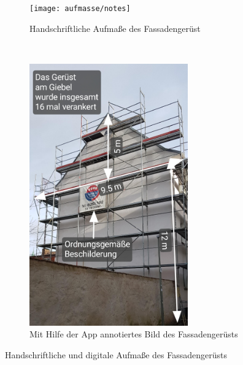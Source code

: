 \begin{figure}[h]
  \begin{subfigure}[t]{0.4\textwidth}
    \centering
    \texttt{[image: aufmasse/notes]}
    \caption{Handschriftliche Aufmaße des Fassadengerüst}
    \label{fig:old}
  \end{subfigure}
  ~
  \begin{subfigure}[t]{0.4\textwidth}
    \centering
    \includegraphics[keepaspectratio, width=0.75\textwidth]{data/annotated}
    \caption{Mit Hilfe der App annotiertes Bild des Fassadengerüsts}
    \label{fig:new}
  \end{subfigure}
  \centering
  \caption{Handschriftliche und digitale Aufmaße des Fassadengerüsts}
  \label{fig:comparison}
\end{figure}

